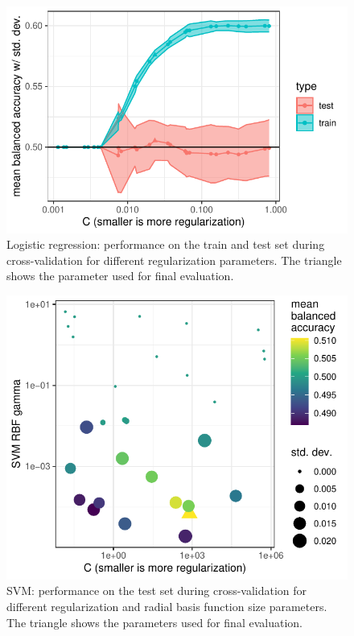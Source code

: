 \begin{figure}[!htpb]
  \includegraphics[width=\linewidth]{../stats/results/learning_curve_logistic.pdf}
  \caption{Logistic regression: performance on the train and test set during cross-validation for different regularization parameters. The triangle shows the parameter used for final evaluation.}
  \label{fig:learning_curve_logistic}
\end{figure}

\begin{figure}[!htpb]
  \includegraphics[width=\linewidth]{../stats/results/learning_curve_svm.pdf}
  \caption{SVM: performance on the test set during cross-validation for different regularization and radial basis function size parameters. The triangle shows the parameters used for final evaluation.}
  \label{fig:learning_curve_svm}
\end{figure}

